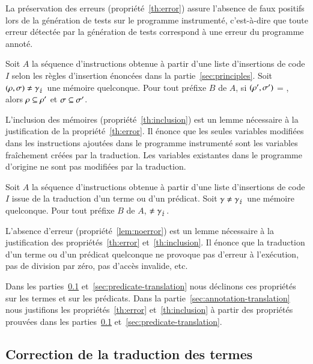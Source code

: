 La préservation des erreurs (propriété~\ref{th:error}) assure l'absence de faux
positifs lors de la génération de tests sur le programme instrumenté,
c'est-à-dire que toute erreur détectée par la génération de tests correspond à
une erreur du programme annoté.

\begin{myproperty}
  \label{th:inclusion}
  Soit $A$ la séquence d'instructions obtenue à partir d'une liste d'insertions
  de code $I$ selon les règles d'insertion énoncées dans la
  partie~\ref{sec:principles}.
  Soit $(\rho, \sigma) \neq \gamma_\lightning$ une mémoire quelconque.
  Pour tout préfixe $B$ de $A$, si
  $(\rho', \sigma')$ = , alors
  $\rho \subseteq \rho'$ et $\sigma \subseteq \sigma'$.
\end{myproperty}

L'inclusion des mémoires (propriété~\ref{th:inclusion}) est un lemme
nécessaire à la justification de la propriété~\ref{th:error}.
Il énonce que les seules variables modifiées dans les instructions ajoutées dans
le programme instrumenté sont les variables fraîchement créées par la
traduction.
Les variables existantes dans le programme d'origine ne sont pas modifiées par
la traduction.

\begin{myproperty}
  \label{lem:noerror}
  Soit $A$ la séquence d'instructions obtenue à partir d'une liste d'insertions
  de code $I$ issue de la traduction d'un terme ou d'un prédicat.
  Soit $\gamma \neq \gamma_\lightning$ une mémoire quelconque.
  Pour tout préfixe $B$ de $A$,  $\neq \gamma_\lightning$.
\end{myproperty}

L'absence d'erreur (propriété~\ref{lem:noerror}) est un lemme nécessaire à la
justification des propriétés~\ref{th:error} et~\ref{th:inclusion}.
Il énonce que la traduction d'un terme ou d'un prédicat \eacsl quelconque ne
provoque pas d'erreur à l'exécution, pas de division par zéro, pas d'accès
invalide, etc.

Dans les parties~\ref{sec:term-translation} et~\ref{sec:predicate-translation}
nous déclinons ces propriétés sur les termes et sur les prédicats.
Dans la partie~\ref{sec:annotation-translation} nous justifions les
propriétés~\ref{th:error} et~\ref{th:inclusion} à partir des propriétés prouvées
dans les parties~\ref{sec:term-translation} et~\ref{sec:predicate-translation}.


\subsection{Correction de la traduction des termes}
\label{sec:term-translation}


